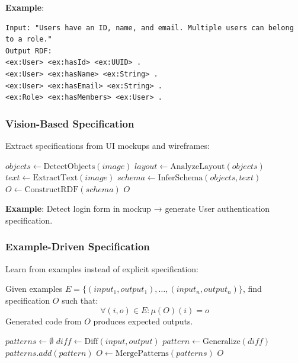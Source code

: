 \textbf{Example}:

\begin{verbatim}
Input: "Users have an ID, name, and email. Multiple users can belong to a role."
Output RDF:
<ex:User> <ex:hasId> <ex:UUID> .
<ex:User> <ex:hasName> <ex:String> .
<ex:User> <ex:hasEmail> <ex:String> .
<ex:Role> <ex:hasMembers> <ex:User> .
\end{verbatim}

\subsubsection{Vision-Based Specification}

Extract specifications from UI mockups and wireframes:

\begin{algorithm}
\caption{Image-to-Specification}
\begin{algorithmic}[1]
    \State $objects \gets \text{DetectObjects}(image)$ 
    \State $layout \gets \text{AnalyzeLayout}(objects)$ 
    \State $text \gets \text{ExtractText}(image)$ 
    \State $schema \gets \text{InferSchema}(objects, text)$
    \State $O \gets \text{ConstructRDF}(schema)$
    \State \Return $O$
\EndProcedure
\end{algorithmic}
\end{algorithm}

\textbf{Example}: Detect login form in mockup → generate User authentication specification.

\subsubsection{Example-Driven Specification}

Learn from examples instead of explicit specification:

\begin{definition}
    Given examples $E = \{(input_1, output_1), \ldots, (input_n, output_n)\}$, find specification $O$ such that:
    \begin{equation}
        \forall (i, o) \in E: \mu(O)(i) = o
    \end{equation}
    Generated code from $O$ produces expected outputs.
\end{definition}

\begin{algorithm}
\caption{Programming by Example}
\begin{algorithmic}[1]
    \State $patterns \gets \emptyset$
        \State $diff \gets \text{Diff}(input, output)$ 
        \State $pattern \gets \text{Generalize}(diff)$ 
        \State $patterns.add(pattern)$
    \EndFor
    \State $O \gets \text{MergePatterns}(patterns)$
    \State \Return $O$
\EndProcedure
\end{algorithmic}
\end{algorithm}

